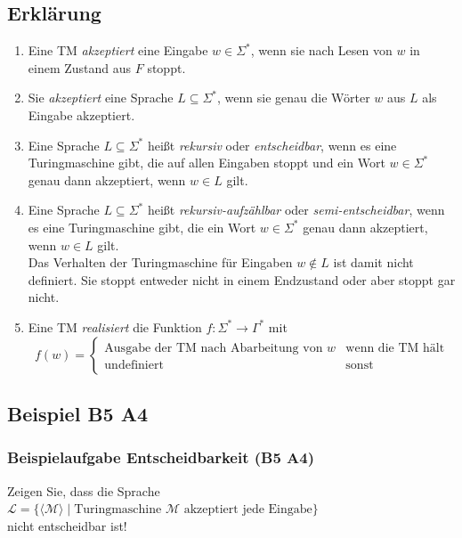 \subsection{Erklärung}
\begin{frame}
	 \begin{enumerate}
  \item Eine TM \emph{akzeptiert} eine Eingabe $w \in \Sigma^*$, wenn sie nach Lesen von $w$ in einem Zustand aus $F$ stoppt.
  \item Sie \emph{akzeptiert} eine Sprache $L \subseteq \Sigma^*$, wenn sie genau die Wörter $w$ aus $L$ als Eingabe akzeptiert.
  \item Eine Sprache $L \subseteq \Sigma^*$ heißt \emph{rekursiv} oder \emph{entscheidbar}, wenn es eine Turingmaschine gibt, die auf allen Eingaben stoppt und
	ein Wort $w \in \Sigma^*$ genau dann akzeptiert, wenn $w \in L$ gilt.
\end{enumerate}
\end{frame}
\begin{frame}
 \begin{enumerate}
 \setcounter{enumi}{3}
  \item Eine Sprache $L \subseteq \Sigma^*$ heißt \emph{rekursiv-aufzählbar} oder \emph{semi-entscheidbar}, wenn es eine Turingmaschine gibt, die ein Wort $w \in \Sigma^*$ genau dann akzeptiert, wenn $w \in L$ gilt. \\ Das Verhalten der Turingmaschine für Eingaben $w \not\in L$ ist damit nicht definiert.
	Sie stoppt entweder nicht in einem Endzustand oder aber stoppt gar nicht.
	\item Eine TM \emph{realisiert} die Funktion $f: \Sigma^* \rightarrow \Gamma^*$ mit $$f(w) = \begin{cases} \text{Ausgabe der TM nach Abarbeitung von } w & \text{wenn die TM hält} \\ \text{undefiniert} & \text{sonst} \end{cases}$$
 \end{enumerate}
\end{frame}
\subsection{Beispiel B5 A4}
\begin{frame}
	\frametitle{Beispielaufgabe Entscheidbarkeit (B5 A4)}
	Zeigen Sie, dass die Sprache \\ $\mathcal{L} = \{ \langle \mathcal{M} \rangle \; | \; \mbox{Turingmaschine $\mathcal{M}$ akzeptiert jede Eingabe} \}$ \\ nicht entscheidbar ist!
\end{frame}

